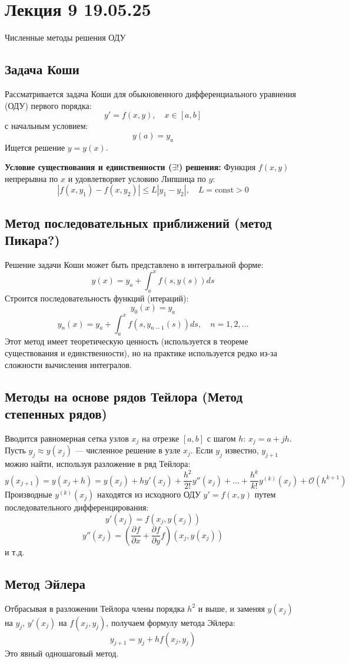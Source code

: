 \section{Лекция 9 19.05.25}

Численные методы решения ОДУ

\subsection{Задача Коши}
Рассматривается задача Коши для обыкновенного дифференциального уравнения (ОДУ) первого порядка:
\[ y' = f(x, y), \quad x \in [a, b] \]
с начальным условием:
\[ y(a) = y_a \]
Ищется решение $y = y(x)$.

\textbf{Условие существования и единственности ($\exists!$) решения:}
Функция $f(x,y)$ непрерывна по $x$ и удовлетворяет условию Липшица по $y$:
\[ |f(x, y_1) - f(x, y_2)| \le L |y_1 - y_2|, \quad L = \text{const} > 0 \]

\subsection{Метод последовательных приближений (метод Пикара?)}
Решение задачи Коши может быть представлено в интегральной форме:
\[ y(x) = y_a + \int_a^x f(s, y(s)) ds\]
Строится последовательность функций (итераций):
\[ y_0(x) = y_a \]
\[ y_n(x) = y_a + \int_a^x f(s, y_{n-1}(s)) ds, \quad n=1, 2, \dots \]
Этот метод имеет теоретическую ценность (используется в теореме существования и единственности), но на практике используется редко из-за сложности вычисления интегралов.

\subsection{Методы на основе рядов Тейлора (Метод степенных рядов)}
Вводится равномерная сетка узлов $x_j$ на отрезке $[a,b]$ с шагом $h$: $x_j = a+jh$.
Пусть $y_j \approx y(x_j)$ --- численное решение в узле $x_j$.
Если $y_j$ известно, $y_{j+1}$ можно найти, используя разложение в ряд Тейлора:
\[ y(x_{j+1}) = y(x_j + h) = y(x_j) + h y'(x_j) + \frac{h^2}{2!} y''(x_j) + \dots + \frac{h^{k}}{k!} y^{(k)}(x_j) + \mathcal{O}(h^{k+1}) \]
Производные $y^{(k)}(x_j)$ находятся из исходного ОДУ $y' = f(x,y)$ путем последовательного дифференцирования:
\[ y'(x_j) = f(x_j, y(x_j)) \]
\[ y''(x_j) = \left( \frac{\partial f}{\partial x} + \frac{\partial f}{\partial y} f \right)(x_j, y(x_j)) \]
и т.д.

\subsection{Метод Эйлера}
Отбрасывая в разложении Тейлора члены порядка $h^2$ и выше, и заменяя $y(x_j)$ на $y_j$, $y'(x_j)$ на $f(x_j, y_j)$, получаем формулу метода Эйлера:
\[ y_{j+1} = y_j + h f(x_j, y_j) \]
Это явный одношаговый метод.

